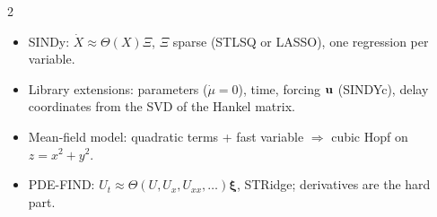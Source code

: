 \begin{paracol}{2}
\begin{keyformulas}
\begin{itemize}
  \item SINDy: $\dot X\approx\Theta(X)\Xi$, $\Xi$ sparse (STLSQ or LASSO), one regression per variable.
  \item Library extensions: parameters ($\dot\mu=0$), time, forcing $\mathbf{u}$ (SINDYc), delay coordinates
        from the SVD of the Hankel matrix.
  \item Mean-field model: quadratic terms + fast variable $\Rightarrow$ cubic Hopf on $z=x^2+y^2$.
  \item PDE-FIND: $U_t\approx\Theta(U,U_x,U_{xx},\dots)\boldsymbol\xi$, STRidge; derivatives are the hard part.
\end{itemize}
\end{keyformulas}

\end{paracol}
